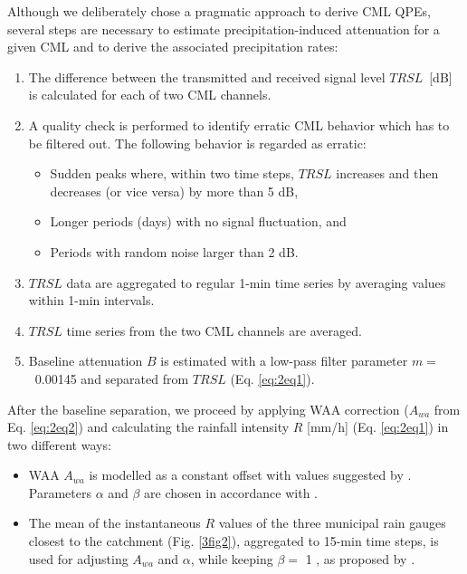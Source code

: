 \documentclass{ctuthesis}\usepackage[]{graphicx}\usepackage[]{color}
\begin{document}
Although we deliberately chose a pragmatic approach to derive CML QPEs, several steps are necessary to estimate precipitation-induced attenuation for a given CML and to derive the associated precipitation rates:
        \begin{enumerate}
                \item The difference between the transmitted and received signal level $TRSL$~[dB] is calculated for each of two CML channels. 
                \item A quality check is performed to identify erratic CML behavior which has to be filtered out. The following behavior is regarded as erratic:
                \begin{itemize}
                        \item Sudden peaks where, within two time steps, $TRSL$ increases and then decreases (or vice versa) by more than 5 dB,
                        \item Longer periods (days) with no signal fluctuation, and
                        \item Periods with random noise larger than 2 dB. 
                \end{itemize}
                \item $TRSL$ data are aggregated to regular 1-min time series by averaging values within 1-min intervals. 
                \item $TRSL$ time series from the two CML channels are averaged. 
                \item Baseline attenuation $B$ is estimated with a low-pass filter parameter $m =$~0.00145 \citep{feniciaMicrowaveLinksRainfall2012} and separated from $TRSL$ (Eq. \ref{eq:2eq1}).
        \end{enumerate}

After the baseline separation, we proceed by applying WAA correction ($A_{wa}$ from Eq. \ref{eq:2eq2}) and calculating the rainfall intensity $R$ [mm/h] (Eq. \ref{eq:2eq1}) in two different ways:
        \begin{itemize}
                \item WAA $A_{wa}$ is modelled as a constant offset with values suggested by \cite{overeemMeasuringUrbanRainfall2011}. Parameters $\alpha$ and $\beta$ are chosen in accordance with \cite{recommendation2005838}.
                \item The mean of the instantaneous $R$ values of the three municipal rain gauges closest to the catchment (Fig. \ref{3fig2}), aggregated to 15-min time steps, is used for adjusting $A_{wa}$ and $\alpha$, while keeping $\beta =$ 1 , as proposed by \cite{fenclGaugeadjustedRainfallEstimates2017}.
        \end{itemize}
\end{document}
